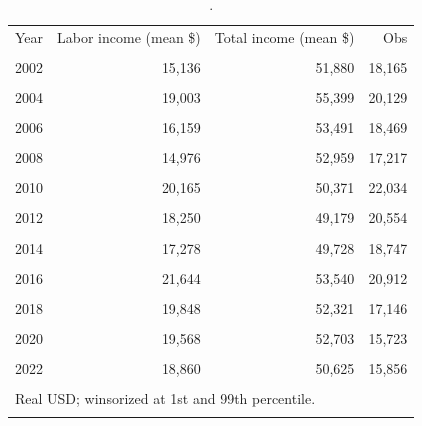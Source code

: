 \begin{table}[htbp]\centering
\caption{.}
\label{tab:income_mean_by_year_real_win}
\begin{tabular}{lrrr}\toprule
Year & Labor income (mean \$) & Total income (mean \$) & Obs \\\\ \midrule
2002 & 15,136 & 51,880 & 18,165 \\\\
2004 & 19,003 & 55,399 & 20,129 \\\\
2006 & 16,159 & 53,491 & 18,469 \\\\
2008 & 14,976 & 52,959 & 17,217 \\\\
2010 & 20,165 & 50,371 & 22,034 \\\\
2012 & 18,250 & 49,179 & 20,554 \\\\
2014 & 17,278 & 49,728 & 18,747 \\\\
2016 & 21,644 & 53,540 & 20,912 \\\\
2018 & 19,848 & 52,321 & 17,146 \\\\
2020 & 19,568 & 52,703 & 15,723 \\\\
2022 & 18,860 & 50,625 & 15,856 \\\\
\bottomrule
\multicolumn{4}{l}{\footnotesize Real USD; winsorized at 1st and 99th percentile.} \\\\
\end{tabular}
\end{table}
